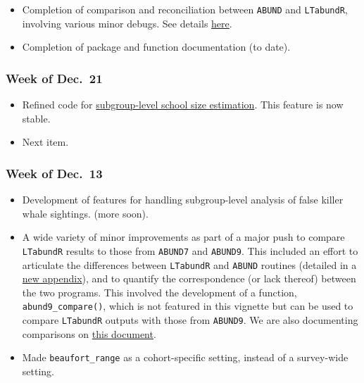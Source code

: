 \documentclass[
]{book}
\begin{document}
\begin{itemize}
\item
  Completion of comparison and reconciliation between \texttt{ABUND} and \texttt{LTabundR}, involving various minor debugs. See details \href{https://docs.google.com/presentation/d/1Vv0Yb2_gk0cEC1OlXlm6ffL9ug99bYvkpLkczg6pb2Q/edit?usp=sharing}{here}.
\item
  Completion of package and function documentation (to date).
\end{itemize}

\hypertarget{week-of-dec.-21}{%
\subsubsection*{Week of Dec.~21}\label{week-of-dec.-21}}

\begin{itemize}
\item
  Refined code for \protect\hyperlink{subgroups}{subgroup-level school size estimation}. This feature is now stable.
\item
  Next item.
\end{itemize}

\hypertarget{week-of-dec.-13}{%
\subsubsection*{Week of Dec.~13}\label{week-of-dec.-13}}

\begin{itemize}
\item
  Development of features for handling subgroup-level analysis of false killer whale sightings. (more soon).
\item
  A wide variety of minor improvements as part of a major push to compare \texttt{LTabundR} results to those from \texttt{ABUND7} and \texttt{ABUND9}. This included an effort to articulate the differences between \texttt{LTabundR} and \texttt{ABUND} routines (detailed in a \protect\hyperlink{abund9_compare}{new appendix}), and to quantify the correspondence (or lack thereof) between the two programs. This involved the development of a function, \texttt{abund9\_compare()}, which is not featured in this vignette but can be used to compare \texttt{LTabundR} outputs with those from \texttt{ABUND9}. We are also documenting comparisons on \href{https://docs.google.com/document/d/1_EZqzOnwSZZCitqTJFIbznGy2Njwbj1YOqMQcbcHI7k/edit?usp=sharing}{this document}.
\item
  Made \texttt{beaufort\_range} as a cohort-specific setting, instead of a survey-wide setting.
\end{itemize}
\end{document}
